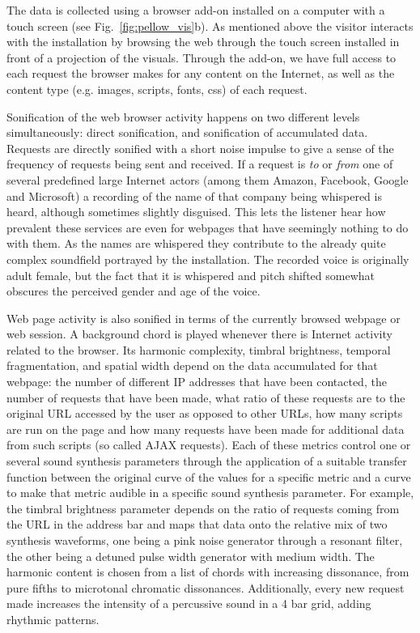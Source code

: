 \documentclass[manuscript,screen]{acmart}
\begin{document}
The data is collected using a browser add-on installed on a computer with a touch screen (see Fig.~\ref{fig:pellow_vis}b). As mentioned above the visitor interacts with the installation by browsing the web through the touch screen installed in front of a projection of the visuals. Through the add-on, we have full access to each request the browser makes for any content on the Internet, as well as the content type (e.g. images, scripts, fonts, css) of each request.


Sonification of the web browser activity happens on two different levels simultaneously: direct sonification, and sonification of accumulated data. Requests are directly sonified with a short noise impulse to give a sense of the frequency of requests being sent and received. If a request is \textit{to} or \textit{from} one of several predefined large Internet actors (among them Amazon, Facebook, Google and Microsoft) a recording of the name of that company being whispered is heard, although sometimes slightly disguised. This lets the listener hear how prevalent these services are even for webpages that have seemingly nothing to do with them. As the names are whispered they contribute to the already quite complex soundfield portrayed by the installation. The recorded voice is originally adult female, but the fact that it is whispered and pitch shifted somewhat obscures the perceived gender and age of the voice.

Web page activity is also sonified in terms of the currently browsed webpage or web session. A background chord is played whenever there is Internet activity related to the browser. Its harmonic complexity, timbral brightness, temporal fragmentation, and spatial width depend on the data accumulated for that webpage: the number of different IP addresses that have been contacted, the number of requests that have been made, what ratio of these requests are to the original URL accessed by the user as opposed to other URLs, how many scripts are run on the page and how many requests have been made for additional data from such scripts (so called AJAX requests). Each of these metrics control one or several sound synthesis parameters through the application of a suitable transfer function between the original curve of the values for a specific metric and a curve to make that metric audible in a specific sound synthesis parameter. For example, the timbral brightness parameter depends on the ratio of requests coming from the URL in the address bar and maps that data onto the relative mix of two synthesis waveforms, one being a pink noise generator through a resonant filter, the other being a detuned pulse width generator with medium width. The harmonic content is chosen from a list of chords with increasing dissonance, from pure fifths to microtonal chromatic dissonances. Additionally, every new request made increases the intensity of a percussive sound in a 4 bar grid, adding rhythmic patterns.
\end{document}
